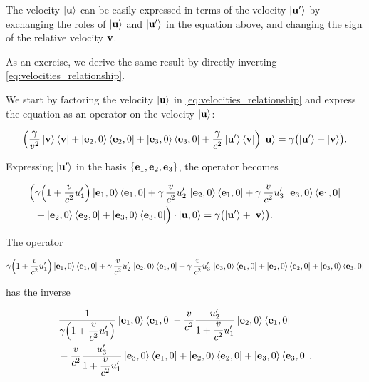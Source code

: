 \documentclass[12pt]{article}
\begin{document}

The velocity $\ket{\vb{u}}$ can be easily expressed in terms of the velocity $\ket{\vb{u}'}$
by exchanging the roles of $\ket{\vb{u}}$ and $\ket{\vb{u}'}$ in the equation above, and
changing the sign of the relative velocity $\vb{v}$.

As an exercise, we derive the same result by directly inverting
\eqref{eq:velocities_relationship}.

We start by factoring the velocity $\ket{\vb{u}}$ in \eqref{eq:velocities_relationship}
and express the equation as an operator on the velocity $\ket{\vb{u}}$:

\[
  \left(
    \frac{\gamma}{v^2}\ket{\vb{v}}\bra{\vb{v}}
    + \ket{\vb{e}_2,0}\bra{\vb{e}_2,0}
    + \ket{\vb{e}_3,0}\bra{\vb{e}_3,0}
    + \frac{\gamma}{c^2}\ket{\vb{u}'}\bra{\vb{v}}
  \right)\ket{\vb{u}}
  =
  \gamma\bigl(\ket{\vb{u}'} + \ket{\vb{v}}\bigr).
\]

Expressing $\ket{\vb{u}'}$ in the basis $\{\vb{e}_1,\vb{e}_2,\vb{e}_3\}$, the operator becomes

\[
  \begin{aligned}
    \Bigl(
      &\gamma\!\left(1 + \frac{v}{c^2}u'_1\right)
        \ket{\vb{e}_1,0}\bra{\vb{e}_1,0}
      + \gamma\,\frac{v}{c^2}u'_2\,
        \ket{\vb{e}_2,0}\bra{\vb{e}_1,0}
      + \gamma\,\frac{v}{c^2}u'_3\,
        \ket{\vb{e}_3,0}\bra{\vb{e}_1,0}
      \\
      &+ \ket{\vb{e}_2,0}\bra{\vb{e}_2,0}
      + \ket{\vb{e}_3,0}\bra{\vb{e}_3,0}
    \Bigr)\cdot\ket{\vb{u},0}
    =
    \gamma\bigl(\ket{\vb{u}'} + \ket{\vb{v}}\bigr).
  \end{aligned}
\]

The operator

\[
  \gamma\!\left(1 + \frac{v}{c^2}u'_1\right)
  \ket{\vb{e}_1,0}\bra{\vb{e}_1,0}
  + \gamma\,\frac{v}{c^2}u'_2\,
    \ket{\vb{e}_2,0}\bra{\vb{e}_1,0}
  + \gamma\,\frac{v}{c^2}u'_3\,
    \ket{\vb{e}_3,0}\bra{\vb{e}_1,0}
  + \ket{\vb{e}_2,0}\bra{\vb{e}_2,0}
  + \ket{\vb{e}_3,0}\bra{\vb{e}_3,0}
\]

has the inverse

\[
  \begin{aligned}
    &\frac{1}{
      \displaystyle
      \gamma\!\left(1 + \frac{v}{c^2}u'_1\right)}
      \ket{\vb{e}_1,0}\bra{\vb{e}_1,0}
    - \frac{v}{c^2}
      \frac{u'_2}{
        \displaystyle
        1 + \frac{v}{c^2}u'_1}
      \ket{\vb{e}_2,0}\bra{\vb{e}_1,0}
    \\
    &- \frac{v}{c^2}
      \frac{u'_3}{
        \displaystyle
        1 + \frac{v}{c^2}u'_1}
      \ket{\vb{e}_3,0}\bra{\vb{e}_1,0}
    + \ket{\vb{e}_2,0}\bra{\vb{e}_2,0}
    + \ket{\vb{e}_3,0}\bra{\vb{e}_3,0}.
  \end{aligned}
\]
\end{document}
